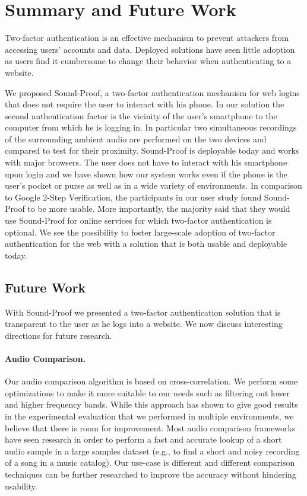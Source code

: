\section{Summary and Future Work}

Two-factor authentication is an effective mechanism to prevent attackers from accessing users' accounts and data. Deployed solutions have seen little adoption as users find it cumbersome to change their behavior when authenticating to a website.

We proposed Sound-Proof, a two-factor authentication mechanism for web logins that does not require the user to interact with his phone. In our solution the second authentication factor is the vicinity of the user's smartphone to the computer from which he is logging in. In particular two simultaneous recordings of the surrounding ambient audio are performed on the two devices and compared to test for their proximity. Sound-Proof is deployable today and works with major browsers. The user does not have to interact with his smartphone upon login and we have shown how our system works even if the phone is the user's pocket or purse as well as in a wide variety of environments. In comparison to Google 2-Step Verification, the participants in our user study found Sound-Proof to be more usable. More importantly, the majority said that they would use Sound-Proof for online services for which two-factor authentication is optional. We see the possibility to foster large-scale adoption of two-factor authentication for the web with a solution that is both usable and deployable today.

\subsection{Future Work}

With Sound-Proof we presented a two-factor authentication solution that is transparent to the user as he logs into a website. We now discuss interesting directions for future research.

\paragraph{Audio Comparison.} Our audio comparison algorithm is based on cross-correlation. We perform some optimizations to make it more suitable to our needs such as filtering out lower and higher frequency bands. While this approach has shown to give good results in the experimental evaluation that we performed in multiple environments, we believe that there is room for improvement. Most audio comparison frameworks have seen research in order to perform a fast and accurate lookup of a short audio sample in a large samples dataset (e.g., to find a short and noisy recording of a song in a music catalog). Our use-case is different and different comparison techniques can be further researched to improve the accuracy without hindering usability.

